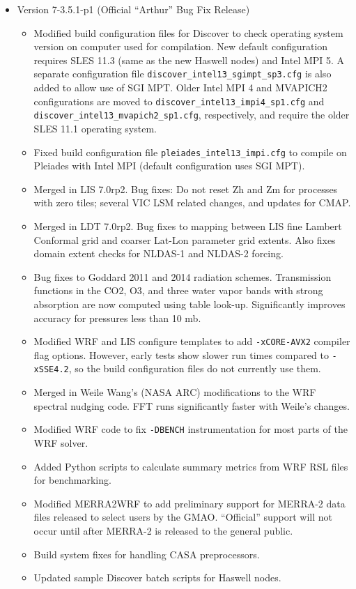 \begin{itemize}
\item Version 7-3.5.1-p1 (Official ``Arthur'' Bug Fix Release)
  \begin{itemize}
  \item Modified build configuration files for Discover to check operating 
    system version on computer used for compilation. New default configuration 
    requires SLES 11.3 (same as the new Haswell nodes) and Intel MPI 5.
    A separate configuration file \texttt{discover\_intel13\_sgimpt\_sp3.cfg} 
    is also added to allow use of SGI MPT. Older Intel MPI 4 and MVAPICH2 
    configurations are moved to \texttt{discover\_intel13\_impi4\_sp1.cfg} and 
    \texttt{discover\_intel13\_mvapich2\_sp1.cfg}, respectively, and require 
    the older SLES 11.1 operating system.
  \item Fixed build configuration file \texttt{pleiades\_intel13\_impi.cfg} to 
    compile on Pleiades with Intel MPI (default configuration uses SGI MPT).
  \item Merged in LIS 7.0rp2. Bug fixes: Do not reset Zh and Zm for processes
    with zero tiles; several VIC LSM related changes, and updates for CMAP.
  \item Merged in LDT 7.0rp2. Bug fixes to mapping between LIS fine
    Lambert Conformal grid and coarser Lat-Lon parameter grid extents. Also
    fixes domain extent checks for NLDAS-1 and NLDAS-2 forcing.
  \item Bug fixes to Goddard 2011 and 2014 radiation schemes. Transmission 
    functions in the CO2, O3, and three water vapor bands with strong 
    absorption are now computed using table look-up.  Significantly improves 
    accuracy for pressures less than 10 mb.
  \item Modified WRF and LIS configure templates to add 
    \texttt{-xCORE-AVX2} compiler flag options. However, early tests show 
    slower run times compared to \texttt{-xSSE4.2}, so the build configuration
    files do not currently use them.
  \item Merged in Weile Wang's (NASA ARC) modifications to the WRF spectral 
    nudging code. FFT runs significantly faster with Weile's changes.
  \item Modified WRF code to fix \texttt{-DBENCH} instrumentation for most 
    parts of the WRF solver.
  \item Added Python scripts to calculate summary metrics from WRF RSL files 
    for benchmarking.
  \item Modified MERRA2WRF to add preliminary support for MERRA-2 data files
    released to select users by the GMAO. ``Official'' support will not occur
    until after MERRA-2 is released to the general public.
  \item Build system fixes for handling CASA preprocessors.
  \item Updated sample Discover batch scripts for Haswell nodes.
  \end{itemize}


\end{itemize}
